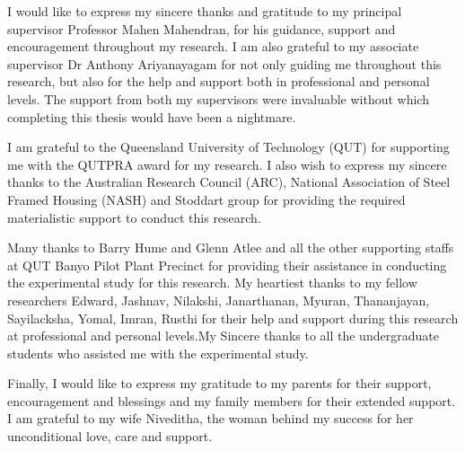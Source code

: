 {

I would like to express my sincere thanks and gratitude to my principal supervisor Professor Mahen Mahendran, for his guidance, support and encouragement throughout my research. I am also grateful to my associate supervisor Dr Anthony Ariyanayagam for not only guiding me throughout this research, but also for the help and support both in professional and personal levels. The support from both my supervisors were invaluable without which completing this thesis would have been a nightmare.

I am grateful to the Queensland University of Technology (QUT) for supporting me with the QUTPRA award for my research. I also wish to express my sincere thanks to the Australian Research Council (ARC), National Association of Steel Framed Housing (NASH) and Stoddart group for providing the required materialistic support to conduct this research. 

Many thanks to Barry Hume and Glenn Atlee and all the other supporting staffs at QUT Banyo Pilot Plant Precinct for providing their assistance in conducting the experimental study for this research. My heartiest thanks to my fellow researchers Edward, Jashnav, Nilakshi, Janarthanan, Myuran, Thananjayan, Sayilacksha, Yomal, Imran, Rusthi for their help and support during this research at professional and personal levels.My Sincere thanks to all the undergraduate students who assisted me with the experimental study.

Finally, I would like to express my gratitude to my parents for their support, encouragement and blessings and my family members for their extended support. I am grateful to my wife Niveditha, the woman behind my success for her unconditional love, care and support.

}